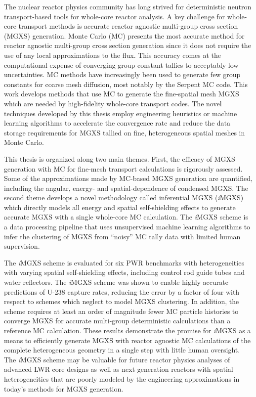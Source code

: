 \begin{abstractpage}

The nuclear reactor physics community has long strived for deterministic neutron transport-based tools for whole-core reactor analysis. A key challenge for whole-core transport methods is accurate reactor agnostic multi-group cross section (MGXS) generation. Monte Carlo (MC) presents the most accurate method for reactor agnostic multi-group cross section generation since it does not require the use of any local approximations to the flux. This accuracy comes at the computational expense of converging group constant tallies to acceptably low uncertainties. MC methods have increasingly been used to generate few group constants for coarse mesh diffusion, most notably by the Serpent MC code. This work develops methods that use MC to generate the fine-spatial mesh MGXS which are needed by high-fidelity whole-core transport codes. The novel techniques developed by this thesis employ engineering heuristics or machine learning algorithms to accelerate the convergence rate and reduce the data storage requirements for MGXS tallied on fine, heterogeneous spatial meshes in Monte Carlo.


This thesis is organized along two main themes. First, the efficacy of MGXS generation with MC for fine-mesh transport calculations is rigorously assessed. Some of the approximations made by MC-based MGXS generation are quantified, including the angular, energy- and spatial-dependence of condensed MGXS. The second theme develops a novel methodology called inferential MGXS (\textit{i}MGXS) which directly models all energy and spatial self-shielding effects to generate accurate MGXS with a single whole-core MC calculation. The \textit{i}MGXS scheme is a data processing pipeline that uses unsupervised machine learning algorithms to infer the clustering of MGXS from ``noisy'' MC tally data with limited human supervision.

The \textit{i}MGXS scheme is evaluated for six PWR benchmarks with heterogeneities with varying spatial self-shielding effects, including control rod guide tubes and water reflectors. The \textit{i}MGXS scheme was shown to enable highly accurate predictions of U-238 capture rates, reducing the error by a factor of four with respect to schemes which neglect to model MGXS clustering. In addition, the scheme requires at least an order of magnitude fewer MC particle histories to converge MGXS for accurate multi-group deterministic calculations than a reference MC calculation. These results demonstrate the promise for \textit{i}MGXS as a means to efficiently generate MGXS with reactor agnostic MC calculations of the complete heterogeneous geometry in a single step with little human oversight. The \textit{i}MGXS scheme may be valuable for future reactor physics analyses of advanced LWR core designs as well as next generation reactors with spatial heterogeneities that are poorly modeled by the engineering approximations in today's methods for MGXS generation.


\end{abstractpage}
